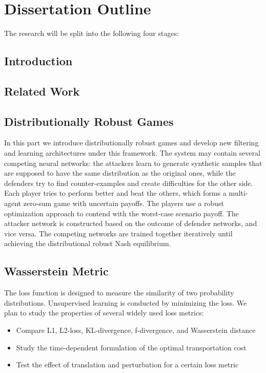 \documentclass{article}
\begin{document}
\section{Dissertation Outline}
\label{Sec:Outline}

The research will be split into the following four stages:

\subsection{Introduction}

\subsection{Related Work}

\subsection{Distributionally Robust Games}
In this part we introduce distributionally robust games and develop new filtering and learning architectures under this framework. The system may contain several competing neural networks: the attackers learn to generate synthetic samples that are supposed to have the same distribution as the original ones, while the defenders try to find counter-examples and create difficulties for the other side. Each player tries to perform better and beat the others, which forms a multi-agent zero-sum game with uncertain payoffs. The players use a robust optimization approach to contend with the worst-case scenario payoff. The attacker network is constructed based on the outcome of defender networks, and vice versa. The competing networks are trained together iteratively until achieving the distributional robust Nash equilibrium.

\subsection{Wasserstein Metric}
The loss function is designed to measure the similarity of two probability distributions. Unsupervised learning is conducted by minimizing the loss. We plan to study the properties of several widely used loss metrics:
\begin{itemize}
\item Compare L1, L2-loss, KL-divergence, f-divergence, and Wasserstein distance
\item Study the time-dependent formulation of the optimal transportation cost
\item Test the effect of translation and perturbation for a certain loss metric
\end{itemize}
\end{document}
